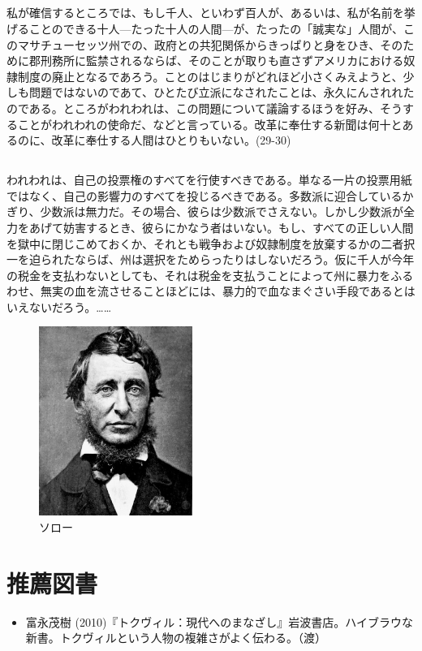 \subsection{}

私が確信するところでは、もし千人、といわず百人が、あるいは、私が名前を挙げることのできる十人{\——}たった十人の人間{\——}が、たったの「誠実な」人間が、このマサチューセッツ州での、政府との共犯関係からきっぱりと身をひき、そのために郡刑務所に監禁されるならば、そのことが取りも直さずアメリカにおける奴隷制度の廃止となるであろう。ことのはじまりがどれほど小さくみえようと、少しも問題ではないのであて、ひとたび立派になされたことは、永久にんされれたのである。ところがわれわれは、この問題について議論するほうを好み、そうすることがわれわれの使命だ、などと言っている。改革に奉仕する新聞は何十とあるのに、改革に奉仕する人間はひとりもいない。(29-30)

\subsection{}

われわれは、自己の投票権のすべてを行使すべきである。単なる一片の投票用紙ではなく、自己の影響力のすべてを投じるべきである。多数派に迎合しているかぎり、少数派は無力だ。その場合、彼らは少数派でさえない。しかし少数派が全力をあげて妨害するとき、彼らにかなう者はいない。もし、すべての正しい人間を獄中に閉じこめておくか、それとも戦争および奴隷制度を放棄するかの二者択一を迫られたならば、州は選択をためらったりはしないだろう。仮に千人が今年の税金を支払わないとしても、それは税金を支払うことによって州に暴力をふるわせ、無実の血を流させることほどには、暴力的で血なまぐさい手段であるとはいえないだろう。……


  \begin{figure}[htbp]
    \centering
      \includegraphics[width=50mm]{images/thoreau.jpg}
    \caption{ソロー}
  \end{figure}



\section{推薦図書}




\begin{itemize}
\item 富永茂樹 (2010)『トクヴィル：現代へのまなざし』岩波書店。ハイブラウな新書。トクヴィルという人物の複雑さがよく伝わる。（渡）

\end{itemize}

